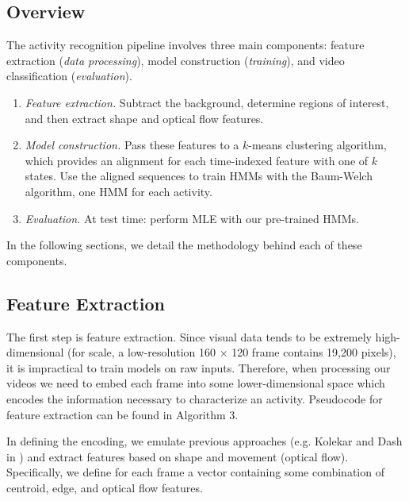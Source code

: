 \documentclass{article}
\begin{document}
\subsection{Overview}

The activity recognition pipeline involves three main components: feature extraction (\textit{data processing}), model construction (\textit{training}), and video classification (\textit{evaluation}).

\begin{enumerate}
    \item \textit{Feature extraction.} Subtract the background, determine regions of interest, and then extract shape and optical flow features.
    \item \textit{Model construction.} Pass these features to a $k$-means clustering algorithm, which provides an alignment for each time-indexed feature with one of $k$ states. Use the aligned sequences to train HMMs with the Baum-Welch algorithm, one HMM for each activity.
    \item \textit{Evaluation.} At test time: perform MLE with our pre-trained HMMs.
\end{enumerate}

In the following sections, we detail the methodology behind each of these components.

\subsection{Feature Extraction}

The first step is feature extraction. Since visual data tends to be extremely high-dimensional (for scale, a low-resolution 160 $\times$ 120 frame contains 19,200 pixels), it is impractical to train models on raw inputs. Therefore, when processing our videos we need to embed each frame into some lower-dimensional space which encodes the information necessary to characterize an activity. Pseudocode for feature extraction can be found in Algorithm 3.

In defining the encoding, we emulate previous approaches (e.g. Kolekar and Dash in \cite{kd2016}) and extract features based on shape and movement (optical flow). Specifically, we define for each frame a vector containing some combination of centroid, edge, and optical flow features.
\end{document}
